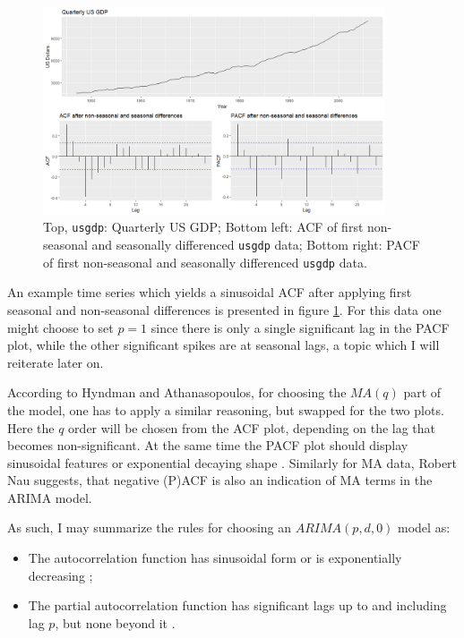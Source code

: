\documentclass[12pt,a4paper,titlepage]{report}
\begin{document}
\begin{figure}[h]
    \centering
    \includegraphics[width=0.9\textwidth]{dusgdpacfpacf}
    \caption{Top, \texttt{usgdp}: Quarterly US GDP; Bottom left: ACF of first non-seasonal and seasonally differenced \texttt{usgdp} data; Bottom right: PACF of first non-seasonal and seasonally differenced \texttt{usgdp} data.}
    \label{usgdpacfpacf}
\end{figure}

An example time series which yields a sinusoidal ACF after applying first seasonal and non-seasonal differences is presented in figure \ref{usgdpacfpacf}. For this data one might choose to set $ p = 1 $ since there is only a single significant lag in the PACF plot, while the other significant spikes are at seasonal lags, a topic which I will reiterate later on. \cite{hyndman2008forecasting}

According to Hyndman and Athanasopoulos, for choosing the $ MA(q) $ part of the model, one has to apply a similar reasoning, but swapped for the two plots. Here the $ q $ order will be chosen from the ACF plot, depending on the lag that becomes non-significant. At the same time the PACF plot should display sinusoidal features or exponential decaying shape \cite{fpp2nonseasonalarima}. Similarly for MA data, Robert Nau suggests, that negative (P)ACF is also an indication of MA terms in the ARIMA model. \cite{nauarimaarmarules}

As such, I may summarize the rules for choosing an $ ARIMA(p, d, 0) $ model as:
\begin{itemize}
    \item The autocorrelation function has sinusoidal form or is exponentially decreasing \cite{nauarimaarmarules};
    \item The partial autocorrelation function has significant lags up to and including lag $ p $, but none beyond it \cite{fpp2nonseasonalarima} .
\end{itemize}
\end{document}
